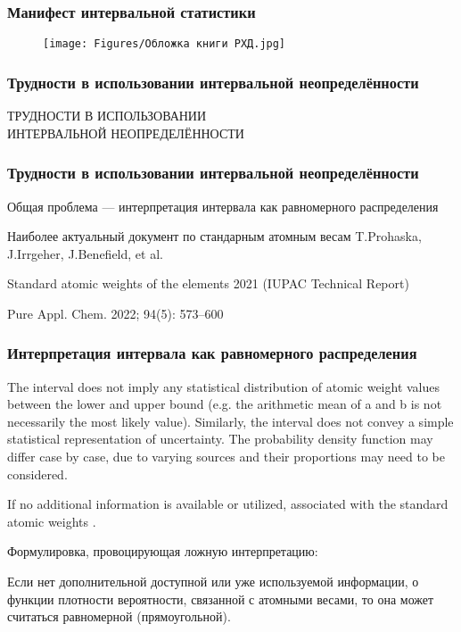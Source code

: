 \begin{frame}
	\frametitle{Манифест интервальной статистики}
	\begin{figure}[ht]
		\centering
		\texttt{[image: Figures/Обложка книги РХД.jpg]}
	\end{figure}
\end{frame}


\begin{frame}
	\frametitle{Трудности в использовании интервальной неопределённости}

\begin{center}	
ТРУДНОСТИ В ИСПОЛЬЗОВАНИИ \\ ИНТЕРВАЛЬНОЙ НЕОПРЕДЕЛЁННОСТИ
\end{center}	
	
\end{frame}


\begin{frame}
	\frametitle{Трудности в использовании интервальной неопределённости}
	
Общая проблема --- интерпретация интервала как равномерного распределения

\medskip
Наиболее актуальный документ по стандарным атомным весам
\medskip
T.Prohaska, J.Irrgeher, J.Benefield, et al. 

\medskip
Standard atomic weights of the elements 2021 (IUPAC Technical Report) 

Pure Appl. Chem. 2022; 94(5): 573–600

	
\end{frame}

\begin{frame}
	\frametitle{Интерпретация интервала как равномерного распределения}
{\footnotesize 
	The interval does not imply any statistical distribution of atomic weight values between the lower and upper bound (e.g. the arithmetic mean of a and b is not necessarily the most likely value). Similarly, the interval does not convey a simple statistical representation of uncertainty. The probability density function may differ case by case, due to varying sources and their proportions may need to be considered. 
	
	If no additional information is available or utilized,  associated with the standard atomic weights .
}
Формулировка, провоцирующая ложную интерпретацию:

Если нет дополнительной доступной или уже используемой информации, о функции плотности вероятности, связанной с атомными весами, то она может считаться равномерной (прямоугольной).
	
\end{frame}


